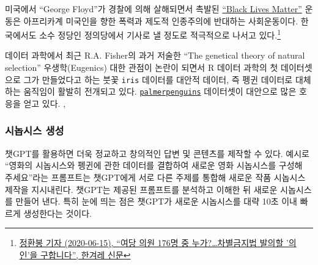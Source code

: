 \documentclass[
  letterpaper,
]{book}
\begin{document}
미국에서 ``George Floyd''가 경찰에 의해 살해되면서 촉발된
\href{https://ko.wikipedia.org/wiki/Black_Lives_Matter}{``Black Lives
Matter''} 운동은 아프리카계 미국인을 향한 폭력과 제도적 인종주의에
반대하는 사회운동이다. 한국에서도 소수 정당인 정의당에서 기사로 낼
정도로 적극적으로 나서고 있다.\footnote{\href{http://www.hani.co.kr/arti/politics/assembly/949422.html}{정환봉
  기자 (2020-06-15), ``여당 의원 176명 중 누가?\ldots 차별금지법 발의할
  '의인'을 구합니다'', 한겨레 신문}}

데이터 과학에서 최근 R.A. Fisher의 과거 저술한 ``The genetical theory of
natural selection'' \autocite{edwards2000genetical} 우생학(Eugenics)
대한 관점이 논란이 되면서 R 데이터 과학의 첫 데이터셋으로 그가
만들었다고 하는 붓꽃 \texttt{iris} 데이터를 대안적 데이터, 즉 펭귄
데이터로 대체하는 움직임이 활발히 전개되고 있다.
\href{https://github.com/allisonhorst/palmerpenguins}{\texttt{palmerpenguins}}
\autocite{penguin2020} 데이터셋이 대안으로 많은 호응을 얻고 있다.
\autocite{AbdulMajedRaja2020}, \autocite{Levy2019} 
 

\hypertarget{uxc2dcuxb189uxc2dcuxc2a4-uxc0dduxc131}{%
\subsubsection{시놉시스
생성}\label{uxc2dcuxb189uxc2dcuxc2a4-uxc0dduxc131}}

챗GPT를 활용하면 더욱 정교하고 창의적인 답변 및 콘텐츠를 제작할 수 있다.
예시로 ``영화의 시놉시스와 펭귄에 관한 데이터를 결합하여 새로운 영화
시놉시스를 구성해 주세요''라는 프롬프트는 챗GPT에게 서로 다른 주제를
통합해 새로운 작품 시놉시스 제작을 지시내린다. 챗GPT는 제공된 프롬프트를
분석하고 이해한 뒤 새로운 시놉시스를 만들어 낸다. 특히 눈에 띄는 점은
챗GPT가 새로운 시놉시스를 대략 10초 이내 빠르게 생성한다는 것이다.
\end{document}
